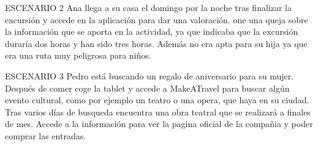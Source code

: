 \documentclass[11pt]{article}
\begin{document}
ESCENARIO 2
Ana llega a su casa el domingo por la noche tras finalizar la excursión y accede en la aplicación para dar una valoración. one una queja sobre la información que se aporta en la actividad, ya que indicaba que la excursión duraría dos horas y han sido tres horas. Además no era apta para su hija ya que era una ruta muy peligrosa para niños.

ESCENARIO 3
Pedro está buscando un regalo de aniversario para su mujer. Después de comer coge la tablet y accede a MakeATravel para buscar algún evento cultural, como por ejemplo un teatro o una opera, que haya en su ciudad. Tras varios días de busqueda encuentra una obra teatral que se realizará a finales de mes. Accede a la información para ver la pagina oficial de la compañia y poder comprar las entradas.
\end{document}
